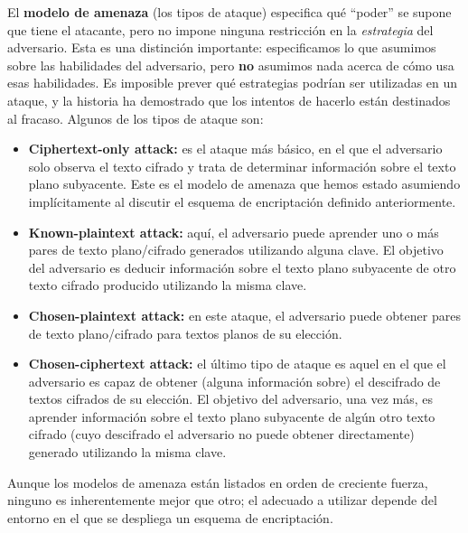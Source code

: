 El \textbf{modelo de amenaza} (los tipos de ataque) especifica qué ``poder'' se supone que tiene el atacante, pero no impone ninguna restricción en la \textit{estrategia} del adversario. Esta es una distinción importante: especificamos lo que asumimos sobre las habilidades del adversario, pero \textbf{no} asumimos nada acerca de cómo usa esas habilidades. Es imposible prever qué estrategias podrían ser utilizadas en un ataque, y la historia ha demostrado que los intentos de hacerlo están destinados al fracaso. Algunos de los tipos de ataque son:
\begin{itemize}
    \item \textbf{Ciphertext-only attack:} es el ataque más básico, en el que el adversario solo observa el texto cifrado y trata de determinar información sobre el texto plano subyacente. Este es el modelo de amenaza que hemos estado asumiendo implícitamente al discutir el esquema de encriptación definido anteriormente.
    \item \textbf{Known-plaintext attack:} aquí, el adversario puede aprender uno o más pares de texto plano/cifrado generados utilizando alguna clave. El objetivo del adversario es deducir información sobre el texto plano subyacente de otro texto cifrado producido utilizando la misma clave.
    \item \textbf{Chosen-plaintext attack:} en este ataque, el adversario puede obtener pares de texto plano/cifrado para textos planos de su elección.
    \item \textbf{Chosen-ciphertext attack:} el último tipo de ataque es aquel en el que el adversario es capaz de obtener (alguna información sobre) el descifrado de textos cifrados de su elección. El objetivo del adversario, una vez más, es aprender información sobre el texto plano subyacente de algún otro texto cifrado (cuyo descifrado el adversario no puede obtener directamente) generado utilizando la misma clave.
\end{itemize}

Aunque los modelos de amenaza están listados en orden de creciente fuerza, ninguno es inherentemente mejor que otro; el adecuado a utilizar depende del entorno en el que se despliega un esquema de encriptación.

\newpage